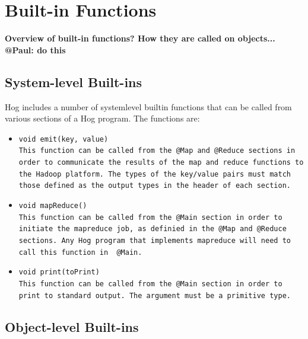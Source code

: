 \documentclass{article}
\begin{document}

\section{Built-in Functions} %
\label{sec:built_in_functions}

\textbf{Overview of built-in functions? How they are called on objects...} \textbf{@Paul: do this}

\subsection{System-level Built-ins} %
\label{sub:system_level_built_ins}

Hog includes a number of system­level built­in functions that can be called from
various sections of a Hog program. The functions are:

\begin{itemize} 

\item[] \tt void emit(key, value) \rm \\

This function can be called from the \tt @Map \rm and \tt @Reduce \rm sections in
order to communicate the results of the map and reduce functions to the Hadoop
platform. The types of the key/value pairs must match those defined as the output
types in the header of each section.

\item[] \tt void mapReduce() \rm \\

This function can be called from the \tt @Main \rm section in order to initiate the
mapreduce job, as definied in the \tt @Map \rm and \tt @Reduce \rm sections. Any
Hog program that implements mapreduce will need to call this function in \tt
@Main\rm.

\item[] \tt void print(toPrint) \rm \\

This function can be called from the \tt @Main \rm section in order to print to
standard output. The argument must be a primitive type.

\end{itemize}


\subsection{Object-level Built-ins} %
\label{sub:object_level_built_ins}
\end{document}
